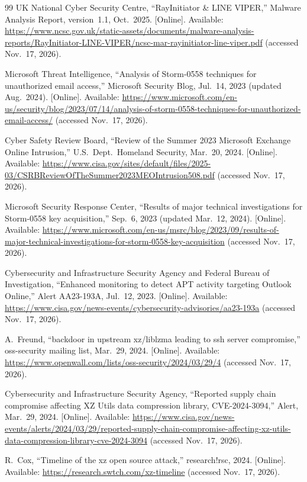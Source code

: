 \documentclass[11pt,a4paper]{article}
\begin{document}
\begin{thebibliography}{99}
UK National Cyber Security Centre, ``RayInitiator \& LINE VIPER,'' Malware Analysis Report, version~1.1, Oct.~2025. [Online]. Available:
\url{https://www.ncsc.gov.uk/static-assets/documents/malware-analysis-reports/RayInitiator-LINE-VIPER/ncsc-mar-rayinitiator-line-viper.pdf} (accessed Nov.~17, 2026).

Microsoft Threat Intelligence, ``Analysis of Storm-0558 techniques for unauthorized email access,'' Microsoft Security Blog, Jul.~14, 2023 (updated Aug.~2024). [Online]. Available:
\url{https://www.microsoft.com/en-us/security/blog/2023/07/14/analysis-of-storm-0558-techniques-for-unauthorized-email-access/} (accessed Nov.~17, 2026).

Cyber Safety Review Board, ``Review of the Summer 2023 Microsoft Exchange Online Intrusion,'' U.S.\ Dept.\ Homeland Security, Mar.~20, 2024. [Online]. Available:
\url{https://www.cisa.gov/sites/default/files/2025-03/CSRBReviewOfTheSummer2023MEOIntrusion508.pdf} (accessed Nov.~17, 2026).

Microsoft Security Response Center, ``Results of major technical investigations for Storm-0558 key acquisition,'' Sep.~6, 2023 (updated Mar.~12, 2024). [Online]. Available:
\url{https://www.microsoft.com/en-us/msrc/blog/2023/09/results-of-major-technical-investigations-for-storm-0558-key-acquisition} (accessed Nov.~17, 2026).

Cybersecurity and Infrastructure Security Agency and Federal Bureau of Investigation, ``Enhanced monitoring to detect APT activity targeting Outlook Online,'' Alert AA23-193A, Jul.~12, 2023. [Online]. Available:
\url{https://www.cisa.gov/news-events/cybersecurity-advisories/aa23-193a} (accessed Nov.~17, 2026).

A.~Freund, ``backdoor in upstream xz/liblzma leading to ssh server compromise,'' oss-security mailing list, Mar.~29, 2024. [Online]. Available:
\url{https://www.openwall.com/lists/oss-security/2024/03/29/4} (accessed Nov.~17, 2026).

Cybersecurity and Infrastructure Security Agency, ``Reported supply chain compromise affecting XZ Utils data compression library, CVE-2024-3094,'' Alert, Mar.~29, 2024. [Online]. Available:
\url{https://www.cisa.gov/news-events/alerts/2024/03/29/reported-supply-chain-compromise-affecting-xz-utils-data-compression-library-cve-2024-3094} (accessed Nov.~17, 2026).

R.~Cox, ``Timeline of the xz open source attack,'' research!rsc, 2024. [Online]. Available: \url{https://research.swtch.com/xz-timeline} (accessed Nov.~17, 2026).


\end{thebibliography}
\end{document}
